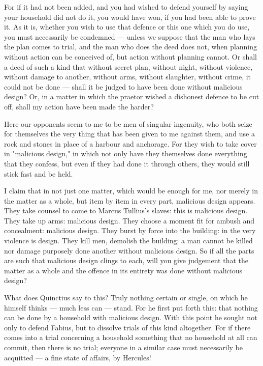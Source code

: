  For if it had not been added, and you had wished to defend yourself by saying your household did not do it, you would have won, if you had been able to prove it. As it is, whether you wish to use that defence or this one which you do use, you must necessarily be condemned --- unless we suppose that the man who lays the plan comes to trial, and the man who does the deed does not, when planning without action can be conceived of, but action without planning cannot. Or shall a deed of such a kind that without secret plan, without night, without violence, without damage to another, without arms, without slaughter, without crime, it could not be done --- shall it be judged to have been done without malicious design? Or, in a matter in which the praetor wished a dishonest defence to be cut off, shall my action have been made the harder?

 Here our opponents seem to me to be men of singular ingenuity, who both seize for themselves the very thing that has been given to me against them, and use a rock and stones in place of a harbour and anchorage. For they wish to take cover in "malicious design," in which not only have they themselves done everything that they confess, but even if they had done it through others, they would still stick fast and be held.

 I claim that in not just one matter, which would be enough for me, nor merely in the matter as a whole, but item by item in every part, malicious design appears. They take counsel to come to Marcus Tullius's slaves: this is malicious design. They take up arms: malicious design. They choose a moment fit for ambush and concealment: malicious design. They burst by force into the building: in the very violence is design. They kill men, demolish the building: a man cannot be killed nor damage purposely done another without malicious design. So if all the parts are such that malicious design clings to each, will you give judgement that the matter as a whole and the offence in its entirety was done without malicious design?

 What does Quinctius say to this? Truly nothing certain or single, on which he himself thinks --- much less can --- stand. For he first put forth this: that nothing can be done by a household with malicious design. With this point he sought not only to defend Fabius, but to dissolve trials of this kind altogether. For if there comes into a trial concerning a household something that no household at all can commit, then there is no trial; everyone in a similar case must necessarily be acquitted --- a fine state of affairs, by Hercules!


